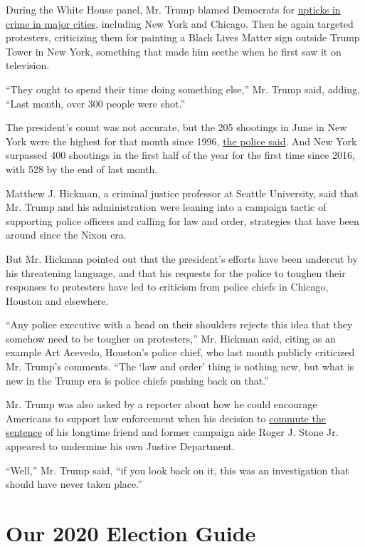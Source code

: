 During the White House panel, Mr. Trump blamed Democrats for
\href{https://www.nytimes.com/2020/07/06/nyregion/murders-nyc-guns-crime.html}{upticks
in crime in major cities}, including New York and Chicago. Then he again
targeted protesters, criticizing them for painting a Black Lives Matter
sign outside Trump Tower in New York, something that made him seethe
when he first saw it on television.

``They ought to spend their time doing something else,'' Mr. Trump said,
adding, ``Last month, over 300 people were shot.''

The president's count was not accurate, but the 205 shootings in June in
New York were the highest for that month since 1996,
\href{https://www.nytimes.com/2020/07/06/nyregion/murders-nyc-guns-crime.html}{the
police said}. And New York surpassed 400 shootings in the first half of
the year for the first time since 2016, with 528 by the end of last
month.

Matthew J. Hickman, a criminal justice professor at Seattle University,
said that Mr. Trump and his administration were leaning into a campaign
tactic of supporting police officers and calling for law and order,
strategies that have been around since the Nixon era.

But Mr. Hickman pointed out that the president's efforts have been
undercut by his threatening language, and that his requests for the
police to toughen their responses to protesters have led to criticism
from police chiefs in Chicago, Houston and elsewhere.

``Any police executive with a head on their shoulders rejects this idea
that they somehow need to be tougher on protesters,'' Mr. Hickman said,
citing as an example Art Acevedo, Houston's police chief, who last month
publicly criticized Mr. Trump's comments. ``The `law and order' thing is
nothing new, but what is new in the Trump era is police chiefs pushing
back on that.''

Mr. Trump was also asked by a reporter about how he could encourage
Americans to support law enforcement when his decision to
\href{https://www.nytimes.com/2020/07/10/us/politics/trump-roger-stone-clemency.html}{commute
the sentence} of his longtime friend and former campaign aide Roger J.
Stone Jr. appeared to undermine his own Justice Department.

``Well,'' Mr. Trump said, ``if you look back on it, this was an
investigation that should have never taken place.''

\hypertarget{our-2020-election-guide}{%
\section{Our 2020 Election Guide}\label{our-2020-election-guide}}

